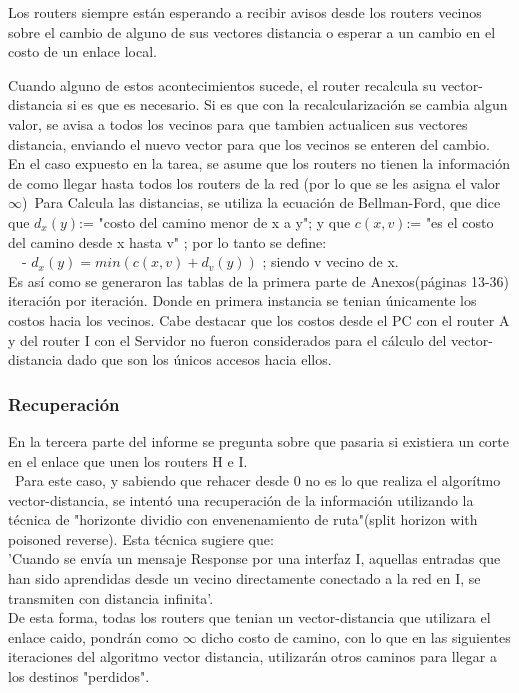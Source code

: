 \documentclass[12pt]{article}
\begin{document}
	Los routers siempre están esperando a recibir avisos desde los routers vecinos sobre el cambio de alguno de sus vectores distancia o esperar a un cambio en el costo de un enlace local.\
	
	Cuando alguno de estos acontecimientos sucede, el router recalcula su vector-distancia si es que es necesario. Si es que con la recalcularización se cambia algun valor, se avisa a todos los vecinos para que tambien actualicen sus vectores distancia, enviando el nuevo vector para que los vecinos se enteren del cambio.\\
	
	En el caso expuesto en la tarea, se asume que los routers no tienen la información de como llegar hasta todos los routers de la red (por lo que se les asigna el valor $\infty$)\
	Para Calcula las distancias, se utiliza la ecuación de Bellman-Ford, que dice que $d_{x}(y)$:= "costo del camino menor de x a y"; y que $c(x,v)$:= "es el costo del camino desde x hasta v" ; por lo tanto se define:\\
\ \	- $d_{x}(y)=min( c(x,v) + d_{v}(y))$ ; siendo v vecino de x.\\

	Es así como se generaron las tablas de la primera parte de Anexos(páginas 13-36) iteración por iteración. Donde en primera instancia se tenian únicamente los costos hacia los vecinos. Cabe destacar que los costos desde el PC con el router A y del router I con el Servidor no fueron considerados para el cálculo del vector-distancia dado que son los únicos accesos hacia ellos.
	
\subsubsection{Recuperación}

	En la tercera parte del informe se pregunta sobre que pasaria si existiera 
un corte en el enlace que unen los routers H e I.\\\
	Para este caso, y sabiendo que rehacer desde 0 no es lo que realiza el algorítmo vector-distancia, se intentó una recuperación de la información utilizando la técnica de "horizonte dividio con envenenamiento de ruta"(split horizon with poisoned reverse). Esta técnica sugiere que:\\
	'Cuando se envía un mensaje Response por una interfaz I, aquellas entradas que han sido aprendidas desde un vecino directamente conectado a la red en I, se transmiten con distancia infinita'.\\
	De esta forma, todas los routers que tenian un vector-distancia que utilizara el enlace caido, pondrán como  $\infty$ dicho costo de camino, con lo que en las siguientes iteraciones del algoritmo vector distancia, utilizarán otros caminos para llegar a los destinos "perdidos".\\
	
\end{document}
